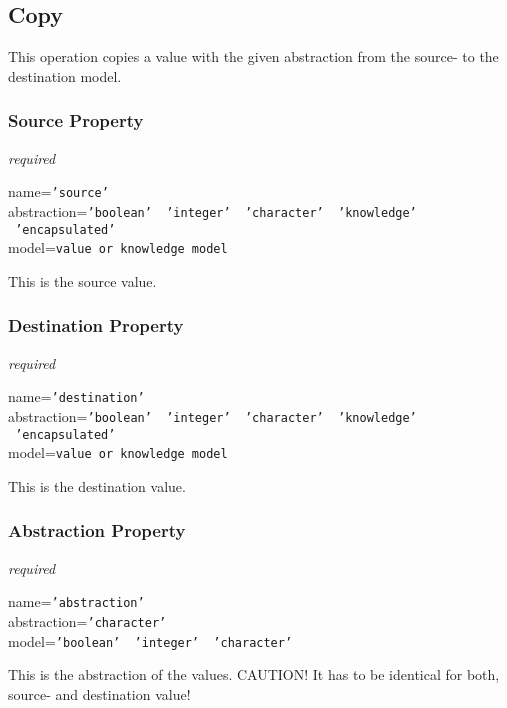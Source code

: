 %
%
%
%
%
%

\subsection{Copy}
\label{copy_heading}

This operation copies a value with the given abstraction from the source- to
the destination model.

\subsubsection{Source Property}

\emph{required}

name=\texttt{'source'}\\
abstraction=\texttt{'boolean' \vline\ 'integer' \vline\ 'character' \vline\ 'knowledge' \vline\ 'encapsulated'}\\
model=\texttt{value or knowledge model}

This is the source value.

\subsubsection{Destination Property}

\emph{required}

name=\texttt{'destination'}\\
abstraction=\texttt{'boolean' \vline\ 'integer' \vline\ 'character' \vline\ 'knowledge' \vline\ 'encapsulated'}\\
model=\texttt{value or knowledge model}

This is the destination value.

\subsubsection{Abstraction Property}

\emph{required}

name=\texttt{'abstraction'}\\
abstraction=\texttt{'character'}\\
model=\texttt{'boolean' \vline\ 'integer' \vline\ 'character'}

This is the abstraction of the values. CAUTION! It has to be identical for
both, source- and destination value!
